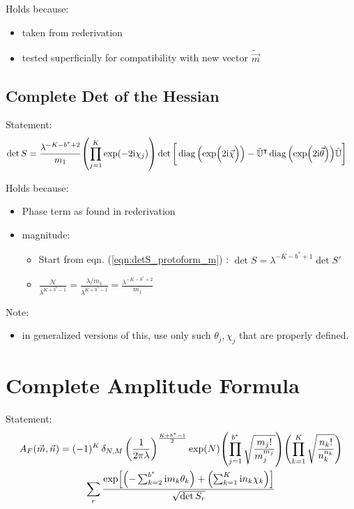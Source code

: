 \documentclass[
	english,
	a4paper,
	fontsize=10pt,
	parskip=half,
	titlepage=true,
	DIV=12,
	final
]{scrreprt}
\newcommand*{\transp}{\ensuremath{^\intercal}}
\newcommand*{\iunit}{\ensuremath{\mathrm{i}}}
\DeclareMathOperator{\diag}{diag}
\begin{document}
Holds because:
\begin{itemize}
\item taken from rederivation
\item tested superficially for compatibility with new vector $\tilde{\vec{m}}$
\end{itemize}

\subsection{Complete Det of the Hessian}
Statement:
\begin{align}
	\det S
&=
	\frac{ \lambda^{-K - b^* + 2} }{ m_1 }
	\qty( \prod_{j=1}^{K} \exp(-2\iunit \chi_j) )
	\det\qty[\bigg.
		\diag\qty(\exp(\Big.2\iunit\vec{\chi}))
		-
		\tilde{\mathbb{U}}\transp
		\diag\qty(\exp(2\iunit\vec{\theta}))
		\tilde{\mathbb{U}}
	]
\label{eqn:detSComplete_m}
\end{align}

Holds because:
\begin{itemize}
\item Phase term as found in rederivation
\item magnitude:
	\begin{itemize}
	\item Start from eqn. (\ref{eqn:detS_protoform_m}) : $\det S = \lambda^{-K - b^* + 1} \det S'$
	\item $
	\frac
		{\mathcal{N}}
		{\lambda^{K + b^* - 1}}
=
	\frac
		{\lambda / m_1}
		{\lambda^{K + b^* - 1}}
=
	\frac{\lambda^{- K - b^* + 2}}{m_1}
$	
	\end{itemize}
\end{itemize}

Note:
\begin{itemize}
\item in generalized versions of this, use only such $\theta_j, \chi_j$ that are properly defined.
\end{itemize}

\section{Complete Amplitude Formula}
Statement:
\begin{multline}
	A_F(\vec{m}, \vec{n})
=
	(-1)^K \, \delta_{N,M} \, 
	\qty(
		\frac{1}{2\pi\lambda}
	)^{\frac{K + b^* - 1}{2}}
	\exp(N)
	\qty( \prod_{j=1}^{b^*}
		\sqrt{\frac
			{ m_j! }
			{ m_j^{m_j} }
	})
	\qty( \prod_{k=1}^{K}
		\sqrt{\frac
			{ n_k! }
			{ n_k^{n_k} }
	})
\\
	\sum_r
		\frac
		{\exp[
			\qty(- \sum_{k=2}^{b^*} \iunit m_k \theta_k) + 
			\qty(  \sum_{k=1}^{K}   \iunit n_k \chi  _k)
		]}
		{\sqrt{\det S_r}}
\end{multline}
\end{document}
